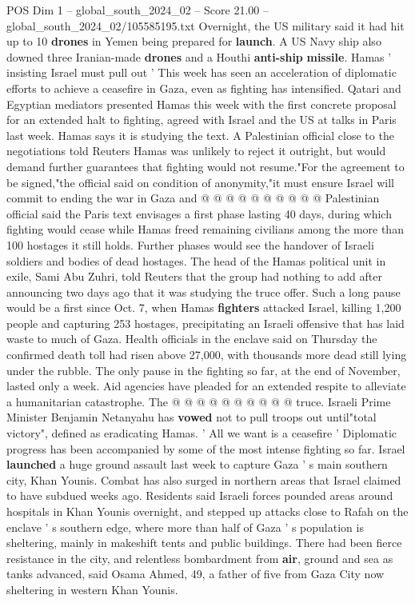 \begin{textsample}{POS Dim 1 – global\_south\_2024\_02 – Score 21.00 – global\_south\_2024\_02/105585195.txt}
Overnight, the US military said it had hit up to 10 \textbf{drones} in Yemen being prepared for \textbf{launch}.
A US Navy ship also downed three Iranian-made \textbf{drones} and a Houthi \textbf{anti-ship} \textbf{missile}.
Hamas ' insisting Israel must pull out ' This week has seen an acceleration of diplomatic efforts to achieve a ceasefire in Gaza, even as fighting has intensified.
Qatari and Egyptian mediators presented Hamas this week with the first concrete proposal for an extended halt to fighting, agreed with Israel and the US at talks in Paris last week.
Hamas says it is studying the text.
A Palestinian official close to the negotiations told Reuters Hamas was unlikely to reject it outright, but would demand further guarantees that fighting would not resume."For the agreement to be signed,"the official said on condition of anonymity,"it must ensure Israel will commit to ending the war in Gaza and @ @ @ @ @ @ @ @ @ @ Palestinian official said the Paris text envisages a first phase lasting 40 days, during which fighting would cease while Hamas freed remaining civilians among the more than 100 hostages it still holds.
Further phases would see the handover of Israeli soldiers and bodies of dead hostages.
The head of the Hamas political unit in exile, Sami Abu Zuhri, told Reuters that the group had nothing to add after announcing two days ago that it was studying the truce offer.
Such a long pause would be a first since Oct. 7, when Hamas \textbf{fighters} attacked Israel, killing 1,200 people and capturing 253 hostages, precipitating an Israeli offensive that has laid waste to much of Gaza.
Health officials in the enclave said on Thursday the confirmed death toll had risen above 27,000, with thousands more dead still lying under the rubble.
The only pause in the fighting so far, at the end of November, lasted only a week.
Aid agencies have pleaded for an extended respite to alleviate a humanitarian catastrophe.
The @ @ @ @ @ @ @ @ @ @ truce.
Israeli Prime Minister Benjamin Netanyahu has \textbf{vowed} not to pull troops out until"total victory", defined as eradicating Hamas. ' All we want is a ceasefire ' Diplomatic progress has been accompanied by some of the most intense fighting so far.
Israel \textbf{launched} a huge ground assault last week to capture Gaza ' s main southern city, Khan Younis.
Combat has also surged in northern areas that Israel claimed to have subdued weeks ago.
Residents said Israeli forces pounded areas around hospitals in Khan Younis overnight, and stepped up attacks close to Rafah on the enclave ' s southern edge, where more than half of Gaza ' s population is sheltering, mainly in makeshift tents and public buildings.
There had been fierce resistance in the city, and relentless bombardment from \textbf{air}, ground and sea as tanks advanced, said Osama Ahmed, 49, a father of five from Gaza City now sheltering in western Khan Younis.

\end{textsample}

